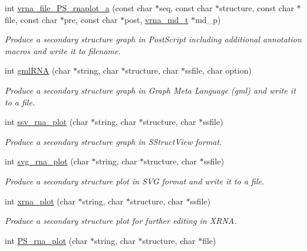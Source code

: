 \begin{DoxyCompactItemize}
int \hyperlink{group__plotting__utils_ga139a31dd0ba9fc6612431f67de901c31}{vrna\+\_\+file\+\_\+\+P\+S\+\_\+rnaplot\+\_\+a} (const char $\ast$seq, const char $\ast$structure, const char $\ast$file, const char $\ast$pre, const char $\ast$post, \hyperlink{group__model__details_ga1f8a10e12a0a1915f2a4eff0b28ea17c}{vrna\+\_\+md\+\_\+t} $\ast$md\+\_\+p)
\begin{DoxyCompactList}\small\item\em Produce a secondary structure graph in Post\+Script including additional annotation macros and write it to \textquotesingle{}filename\textquotesingle{}. \end{DoxyCompactList}\item 
int \hyperlink{group__plotting__utils_ga70834bc8c0aad4fe6824ff76ccb8f329}{gml\+R\+NA} (char $\ast$string, char $\ast$structure, char $\ast$ssfile, char option)
\begin{DoxyCompactList}\small\item\em Produce a secondary structure graph in Graph Meta Language (gml) and write it to a file. \end{DoxyCompactList}\item 
int \hyperlink{group__plotting__utils_gadd368528755f9a830727b680243541df}{ssv\+\_\+rna\+\_\+plot} (char $\ast$string, char $\ast$structure, char $\ast$ssfile)
\begin{DoxyCompactList}\small\item\em Produce a secondary structure graph in S\+Struct\+View format. \end{DoxyCompactList}\item 
int \hyperlink{group__plotting__utils_gae7853539b5df98f294b4af434e979304}{svg\+\_\+rna\+\_\+plot} (char $\ast$string, char $\ast$structure, char $\ast$ssfile)
\begin{DoxyCompactList}\small\item\em Produce a secondary structure plot in S\+VG format and write it to a file. \end{DoxyCompactList}\item 
int \hyperlink{group__plotting__utils_ga2f6d5953e6a323df898896b8d6614483}{xrna\+\_\+plot} (char $\ast$string, char $\ast$structure, char $\ast$ssfile)
\begin{DoxyCompactList}\small\item\em Produce a secondary structure plot for further editing in X\+R\+NA. \end{DoxyCompactList}\item 
int \hyperlink{group__plotting__utils_ga0873c7cc4cd7a11c9a2cea19dde7e9c9}{P\+S\+\_\+rna\+\_\+plot} (char $\ast$string, char $\ast$structure, char $\ast$file)

\end{DoxyCompactItemize}
